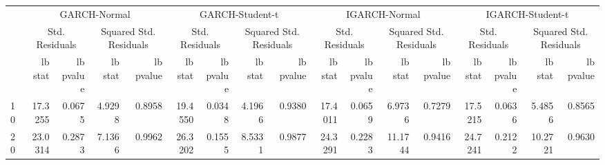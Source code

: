 \begin{table}[htbp]
\centering
\begin{tabular}{lrrrrrrrrrrrrrrrr}
\toprule
 & \multicolumn{4}{c}{GARCH-Normal} & \multicolumn{4}{c}{GARCH-Student-t} & \multicolumn{4}{c}{IGARCH-Normal} & \multicolumn{4}{c}{IGARCH-Student-t} \\
 & \multicolumn{2}{c}{Std. Residuals} & \multicolumn{2}{c}{Squared Std. Residuals} & \multicolumn{2}{c}{Std. Residuals} & \multicolumn{2}{c}{Squared Std. Residuals} & \multicolumn{2}{c}{Std. Residuals} & \multicolumn{2}{c}{Squared Std. Residuals} & \multicolumn{2}{c}{Std. Residuals} & \multicolumn{2}{c}{Squared Std. Residuals} \\
 & lb stat & lb pvalue & lb stat & lb pvalue & lb stat & lb pvalue & lb stat & lb pvalue & lb stat & lb pvalue & lb stat & lb pvalue & lb stat & lb pvalue & lb stat & lb pvalue \\
\midrule
10 & 17.3255 & 0.0675 & 4.9298 & 0.8958 & 19.4550 & 0.0348 & 4.1966 & 0.9380 & 17.4011 & 0.0659 & 6.9736 & 0.7279 & 17.5215 & 0.0636 & 5.4856 & 0.8565 \\
20 & 23.0314 & 0.2873 & 7.1366 & 0.9962 & 26.3202 & 0.1555 & 8.5331 & 0.9877 & 24.3291 & 0.2283 & 11.1744 & 0.9416 & 24.7241 & 0.2122 & 10.2721 & 0.9630 \\
\bottomrule
\end{tabular}
\label{tab:residual_diagnostics}
\end{table}
